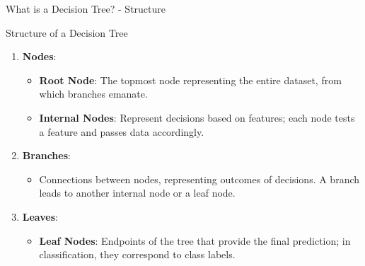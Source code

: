 \documentclass[aspectratio=169]{beamer}
\begin{document}
\begin{frame}[fragile]{What is a Decision Tree? - Structure}
    \begin{block}{Structure of a Decision Tree}
        \begin{enumerate}
            \item \textbf{Nodes}:
                \begin{itemize}
                    \item \textbf{Root Node}: The topmost node representing the entire dataset, from which branches emanate.
                    \item \textbf{Internal Nodes}: Represent decisions based on features; each node tests a feature and passes data accordingly.
                \end{itemize}
            \item \textbf{Branches}:
                \begin{itemize}
                    \item Connections between nodes, representing outcomes of decisions. A branch leads to another internal node or a leaf node.
                \end{itemize}
            \item \textbf{Leaves}:
                \begin{itemize}
                    \item \textbf{Leaf Nodes}: Endpoints of the tree that provide the final prediction; in classification, they correspond to class labels.
                \end{itemize}
        \end{enumerate}
    \end{block}
\end{frame}
\end{document}
